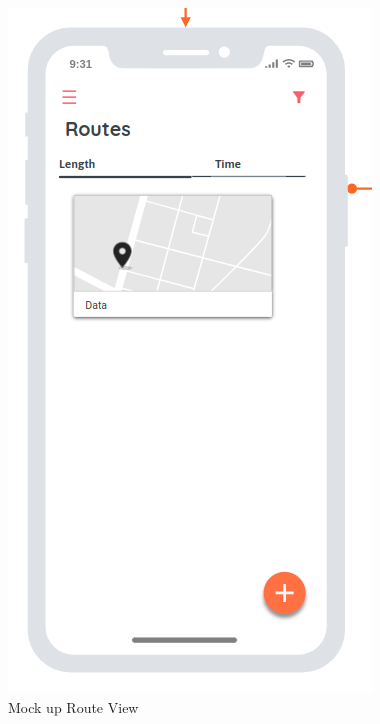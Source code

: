     \begin{figure}[h!]
        \includegraphics[width=\linewidth]{./graphics/routeView_Mockup.png}
        \caption{Mock up Route View}
        \label{fig:routeViewMockup}
    \end{figure}

